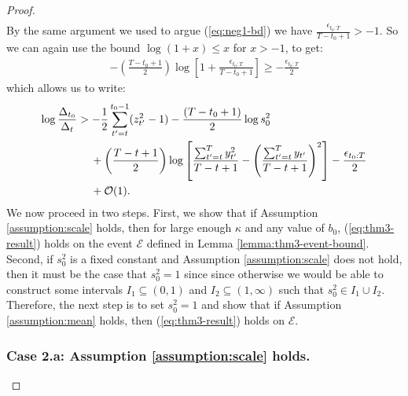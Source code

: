 \begin{proof}
\begin{align}
\end{align}
By the same argument we used to argue (\ref{eq:neg1-bd}) we have $\frac{\epsilon_{t_0:T}}{T-t_0+1} > -1$. So we can again use the bound $\log(1+x) \leq x$ for $x > -1$, to get: 
\begin{align*}
    -\left(\frac{T - t_0 +1}{2}\right)\log \left[1 + \frac{\epsilon_{t_0:T}}{T-t_0+1}\right] \geq -  \frac{\epsilon_{t_0:T}}{2}
\end{align*}
which allows us to write:
\begin{align}
    \log \frac{\Delta_{t_0}}{\Delta_t} &> - \frac{1}{2} \sum_{t' = t}^{t_0 - 1} (z_{t'}^2-1) - \frac{(T-t_0+1)}{2}\log s_0^2 \notag \\
    &\quad\: + \left(\frac{T - t +1}{2}\right)\log\left[\frac{\sum_{t'=t}^T y_{t'}^2}{T-t+1} - \left(\frac{\sum_{t'=t}^T y_{t'}}{T-t+1}\right)^2 \right] - \frac{\epsilon_{t_0:T}}{2} \notag \\
    &\quad\: + \mathcal{O}(1). \label{eq:thm3-cs2-bd1}
\end{align}
We now proceed in two steps. First, we show that if Assumption \ref{assumption:scale} holds, then for large enough $\kappa$ and any value of $b_0$, (\ref{eq:thm3-result}) holds on the event $\mathcal{E}$ defined in Lemma \ref{lemma:thm3-event-bound}. Second, if $s_0^2$ is a fixed constant and Assumption \ref{assumption:scale} does not hold, then it must be the case that $s_0^2 = 1$ since since otherwise we would be able to construct some intervals $I_1\subseteq(0,1)$ and $I_2 \subseteq(1,\infty)$ such that $s_0^2 \in I_1\cup I_2$. Therefore, the next step is to set $s_0^2 = 1$ and show that if Assumption \ref{assumption:mean} holds, then (\ref{eq:thm3-result}) holds on $\mathcal{E}$.

\subsubsection*{Case 2.a: Assumption \ref{assumption:scale} holds.}


\end{proof}
